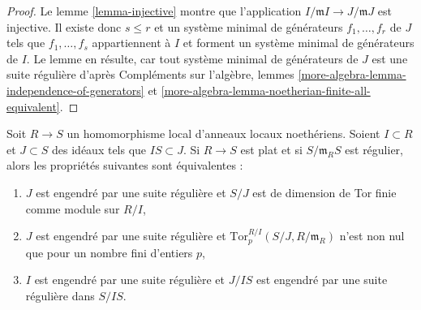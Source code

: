 \begin{proof}
Le lemme \ref{lemma-injective} montre que l'application
$I/\mathfrak m I \to J/\mathfrak m J$
est injective. Il existe donc $s \leq r$ et un système minimal de
générateurs $f_1, \ldots, f_r$ de $J$ tels que $f_1, \ldots, f_s$ appartiennent à $I$
et forment un système minimal de générateurs de $I$.
Le lemme en résulte, car tout système minimal de générateurs de $J$
est une suite régulière d'après
Compléments sur l'algèbre, lemmes
\ref{more-algebra-lemma-independence-of-generators} et
\ref{more-algebra-lemma-noetherian-finite-all-equivalent}.
\end{proof}

\begin{lemma}
\label{lemma-perfect-map-ci}
Soit $R \to S$ un homomorphisme local d'anneaux locaux noethériens.
Soient $I \subset R$ et $J \subset S$ des idéaux tels que
$IS \subset J$. Si $R \to S$ est plat et si $S/\mathfrak m_RS$ est
régulier, alors les propriétés suivantes sont équivalentes :
\begin{enumerate}
\item $J$ est engendré par une suite régulière et
$S/J$ est de dimension de Tor finie comme module sur $R/I$,
\item $J$ est engendré par une suite régulière et
$\text{Tor}^{R/I}_p(S/J, R/\mathfrak m_R)$ n'est non nul
que pour un nombre fini d'entiers $p$,
\item $I$ est engendré par une suite
régulière et $J/IS$ est engendré par une suite régulière dans $S/IS$.
\end{enumerate}
\end{lemma}

